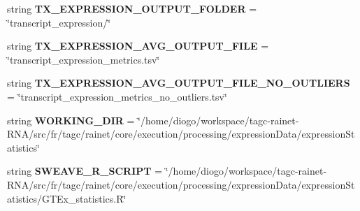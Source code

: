 \begin{DoxyCompactItemize}
\item 
\hypertarget{classsrc_1_1fr_1_1tagc_1_1rainet_1_1core_1_1execution_1_1processing_1_1expressionData_1_1ProcessGTExData_1_1ProcessGTExData_afc6ece3187edd63abf85a54a8a737985}{string {\bfseries T\-X\-\_\-\-E\-X\-P\-R\-E\-S\-S\-I\-O\-N\-\_\-\-O\-U\-T\-P\-U\-T\-\_\-\-F\-O\-L\-D\-E\-R} = \char`\"{}transcript\-\_\-expression/\char`\"{}}\label{classsrc_1_1fr_1_1tagc_1_1rainet_1_1core_1_1execution_1_1processing_1_1expressionData_1_1ProcessGTExData_1_1ProcessGTExData_afc6ece3187edd63abf85a54a8a737985}

\item 
\hypertarget{classsrc_1_1fr_1_1tagc_1_1rainet_1_1core_1_1execution_1_1processing_1_1expressionData_1_1ProcessGTExData_1_1ProcessGTExData_ab7cd9a627fedf3fc2971606394dd8263}{string {\bfseries T\-X\-\_\-\-E\-X\-P\-R\-E\-S\-S\-I\-O\-N\-\_\-\-A\-V\-G\-\_\-\-O\-U\-T\-P\-U\-T\-\_\-\-F\-I\-L\-E} = \char`\"{}transcript\-\_\-expression\-\_\-metrics.\-tsv\char`\"{}}\label{classsrc_1_1fr_1_1tagc_1_1rainet_1_1core_1_1execution_1_1processing_1_1expressionData_1_1ProcessGTExData_1_1ProcessGTExData_ab7cd9a627fedf3fc2971606394dd8263}

\item 
\hypertarget{classsrc_1_1fr_1_1tagc_1_1rainet_1_1core_1_1execution_1_1processing_1_1expressionData_1_1ProcessGTExData_1_1ProcessGTExData_a5fd91919913f7079b32f7188b296284e}{string {\bfseries T\-X\-\_\-\-E\-X\-P\-R\-E\-S\-S\-I\-O\-N\-\_\-\-A\-V\-G\-\_\-\-O\-U\-T\-P\-U\-T\-\_\-\-F\-I\-L\-E\-\_\-\-N\-O\-\_\-\-O\-U\-T\-L\-I\-E\-R\-S} = \char`\"{}transcript\-\_\-expression\-\_\-metrics\-\_\-no\-\_\-outliers.\-tsv\char`\"{}}\label{classsrc_1_1fr_1_1tagc_1_1rainet_1_1core_1_1execution_1_1processing_1_1expressionData_1_1ProcessGTExData_1_1ProcessGTExData_a5fd91919913f7079b32f7188b296284e}

\item 
\hypertarget{classsrc_1_1fr_1_1tagc_1_1rainet_1_1core_1_1execution_1_1processing_1_1expressionData_1_1ProcessGTExData_1_1ProcessGTExData_a23d2a36aaed8c7c49ac99c0af4d07351}{string {\bfseries W\-O\-R\-K\-I\-N\-G\-\_\-\-D\-I\-R} = \char`\"{}/home/diogo/workspace/tagc-\/rainet-\/R\-N\-A/src/fr/tagc/rainet/core/execution/processing/expression\-Data/expression\-Statistics\char`\"{}}\label{classsrc_1_1fr_1_1tagc_1_1rainet_1_1core_1_1execution_1_1processing_1_1expressionData_1_1ProcessGTExData_1_1ProcessGTExData_a23d2a36aaed8c7c49ac99c0af4d07351}

\item 
\hypertarget{classsrc_1_1fr_1_1tagc_1_1rainet_1_1core_1_1execution_1_1processing_1_1expressionData_1_1ProcessGTExData_1_1ProcessGTExData_a77882d47c2890b3f41db1be205a72ab4}{string {\bfseries S\-W\-E\-A\-V\-E\-\_\-\-R\-\_\-\-S\-C\-R\-I\-P\-T} = \char`\"{}/home/diogo/workspace/tagc-\/rainet-\/R\-N\-A/src/fr/tagc/rainet/core/execution/processing/expression\-Data/expression\-Statistics/G\-T\-Ex\-\_\-statistics.\-R\char`\"{}}\label{classsrc_1_1fr_1_1tagc_1_1rainet_1_1core_1_1execution_1_1processing_1_1expressionData_1_1ProcessGTExData_1_1ProcessGTExData_a77882d47c2890b3f41db1be205a72ab4}


\end{DoxyCompactItemize}
